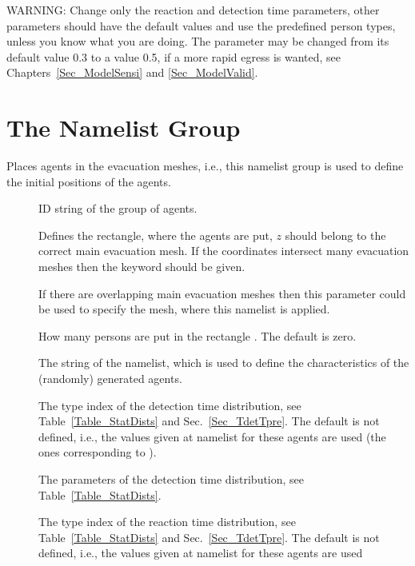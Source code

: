 \documentclass[12pt,a4paper,final,twoside]{stylevk}
\begin{document}
\noindent WARNING: Change only the reaction and detection time
parameters, other parameters should have the default values and use
the predefined person types, unless you know what you are doing.  The
parameter  may be changed from its default value 0.3
to a value 0.5, if a more rapid egress is wanted, see
Chapters~\ref{Sec_ModelSensi} and \ref{Sec_ModelValid}.

 
\section{The  Namelist Group}\label{Sec_EvacNML}

\noindent Places agents in the evacuation meshes, i.e., this
namelist group is used to define the initial positions of the agents.
%
\begin{description}
%
\item[] ID string of the group of agents.
%
\item[] Defines the rectangle, where the agents are put, $z$
  should belong to the correct main evacuation mesh.  If the
  coordinates  intersect many evacuation meshes then the
  keyword  should be given.
%
\item[] If there are overlapping main evacuation
  meshes then this parameter could be used to specify the mesh, where
  this  namelist is applied.
%
\item[] How many persons are put in
  the rectangle .  The default is zero.
%
\item[] The  string of the 
  namelist, which is used to define the characteristics of the
  (randomly) generated agents.
%
\item[] The type index of the detection time
  distribution, see Table~\ref{Table_StatDists} and
  Sec.~\ref{Sec_TdetTpre}.  The default is not defined, i.e.,
  the values given at  namelist for these agents are used
  (the ones corresponding to ).
%
\item[] The
  parameters of the detection time distribution, see
  Table~\ref{Table_StatDists}.
%
\item[] The type index of the reaction time
  distribution, see Table~\ref{Table_StatDists} and
  Sec.~\ref{Sec_TdetTpre}.  The default is not defined, i.e.,
  the values given at  namelist for these agents are used

\end{description}
\end{document}
